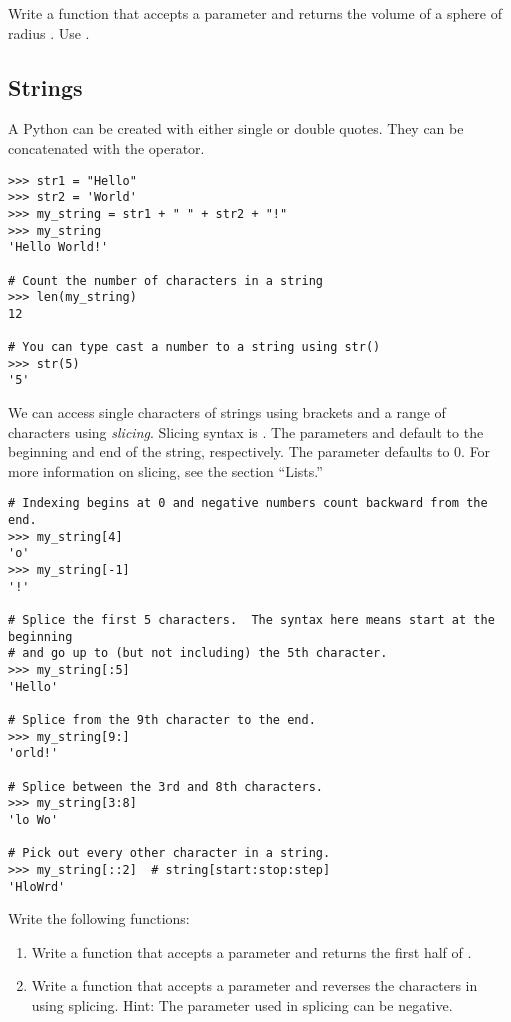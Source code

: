 \begin{problem}
Write a function  that accepts a parameter  and returns the volume of a sphere of radius . Use .
\end{problem}


\subsection*{Strings}
A Python  can be created with either single or double quotes. They can be concatenated with the \li{+} operator.
\begin{lstlisting}
>>> str1 = "Hello"
>>> str2 = 'World'
>>> my_string = str1 + " " + str2 + "!"
>>> my_string
'Hello World!'

# Count the number of characters in a string
>>> len(my_string)
12

# You can type cast a number to a string using str()
>>> str(5)
'5'
\end{lstlisting}

We can access single characters of strings using brackets and a range of characters using \emph{slicing}. Slicing syntax is . The parameters  and  default to the beginning and end of the string, respectively. The parameter  defaults to 0. For more information on slicing, see the section ``Lists.''

\begin{lstlisting}
# Indexing begins at 0 and negative numbers count backward from the end.
>>> my_string[4]
'o'
>>> my_string[-1]
'!'

# Splice the first 5 characters.  The syntax here means start at the beginning
# and go up to (but not including) the 5th character.
>>> my_string[:5]
'Hello'

# Splice from the 9th character to the end.
>>> my_string[9:]
'orld!'

# Splice between the 3rd and 8th characters.
>>> my_string[3:8]
'lo Wo'

# Pick out every other character in a string.
>>> my_string[::2]	# string[start:stop:step]
'HloWrd'
\end{lstlisting}

\begin{problem}
Write the following functions:
\begin{enumerate}
\item Write a function  that accepts a parameter  and returns the first half of .
\item Write a function  that accepts a parameter  and reverses the characters in  using splicing.  Hint: The  parameter used in splicing can be negative.
\end{enumerate}
\end{problem}

